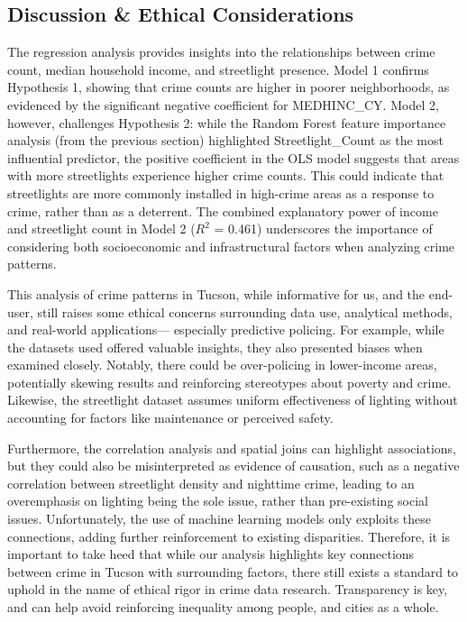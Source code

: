 \documentclass{report}
\begin{document}
\subsection{Discussion \& Ethical Considerations}
\par The regression analysis provides insights into the relationships between crime count, median household income, and streetlight presence. Model 1 confirms Hypothesis 1, showing that crime counts are higher in poorer neighborhoods, as evidenced by the significant negative coefficient for MEDHINC\_CY. Model 2, however, challenges Hypothesis 2: while the Random Forest feature importance analysis (from the previous section) highlighted Streetlight\_Count as the most influential predictor, the positive coefficient in the OLS model suggests that areas with more streetlights experience higher crime counts. This could indicate that streetlights are more commonly installed in high-crime areas as a response to crime, rather than as a deterrent. The combined explanatory power of income and streetlight count in Model 2 ($R^2$ = 0.461) underscores the importance of considering both socioeconomic and infrastructural factors when analyzing crime patterns.

\par This analysis of crime patterns in Tucson, while informative for us, and the end-user, still raises some ethical concerns surrounding data use, analytical methods, and real-world applications— especially predictive policing. For example,  while the datasets used offered valuable insights, they also presented biases when examined closely. Notably, there could be over-policing in lower-income areas, potentially skewing results and reinforcing stereotypes about poverty and crime. Likewise, the streetlight dataset assumes uniform effectiveness of lighting without accounting for factors like maintenance or perceived safety.

\par Furthermore,  the correlation analysis and spatial joins can highlight associations, but they could also be misinterpreted as evidence of causation, such as a negative correlation between streetlight density and nighttime crime, leading to an overemphasis on lighting being the sole issue, rather than pre-existing social issues. Unfortunately, the use of machine learning models only exploits these connections, adding further reinforcement to existing disparities.  Therefore, it is important to take heed that while our analysis highlights key connections between crime in Tucson with surrounding factors, there still exists a standard to uphold in the name of ethical rigor in crime data research. Transparency is key, and can help avoid reinforcing inequality among people, and cities as a whole.
\end{document}
